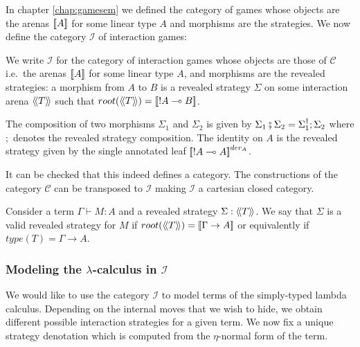 In chapter \ref{chap:gamesem} we defined the category of games whose objects are the arenas ${[\![ A ]\!]}$ for some linear type $A$ and morphisms are the strategies. We now define the category $\mathcal{I}$ of interaction games:
\begin{dfn}
We write $\mathcal{I}$ for the category of interaction games whose objects are those of $\mathcal{C}$ i.e.\ the arenas
${[\![ A ]\!]}$ for some linear type $A$, and morphisms are the revealed strategies: a morphism from $A$ to $B$ is a revealed strategy $\Sigma$ on some interaction arena ${\langle\!\langle T \rangle\!\rangle}$
such that $root({\langle\!\langle T \rangle\!\rangle}) = {[\![ !A\multimap B ]\!]}$.

The composition of two morphisms $\Sigma_1$ and $\Sigma_2$ is given
by $\Sigma_1 \fatsemi \Sigma_2 = \Sigma_1^\dagger ; \Sigma_2$ where
$;$ denotes the revealed strategy composition. The identity on $A$
is the revealed strategy given by the single annotated leaf ${[\![ !A
\multimap A ]\!]}^{der_A}$.
\end{dfn}

It can be checked that this indeed defines a category. The constructions of the category $\mathcal{C}$ can be transposed to $\mathcal{I}$
making $\mathcal{I}$ a cartesian closed category.


\begin{dfn}
Consider a term $\Gamma \vdash M : A$ and a revealed strategy
$\Sigma : {\langle\!\langle T \rangle\!\rangle}$. We say that $\Sigma$ is a valid revealed
strategy for $M$ if $root({\langle\!\langle T \rangle\!\rangle}) = {[\![ \Gamma \rightarrow
A ]\!]}$ or equivalently if $type(T) = \Gamma \rightarrow A$.
\end{dfn}


\subsubsection{Modeling the $\lambda$-calculus in $\mathcal{I}$}

We would like to use the category $\mathcal{I}$ to model terms of
the simply-typed lambda calculus.
Depending on the internal moves that we wish to hide, we obtain different possible interaction strategies for a given term.
We now fix a unique strategy denotation which is computed from the $\eta$-normal form of the term.

